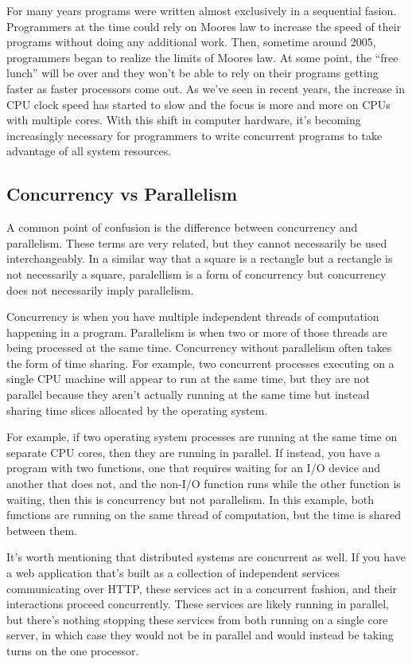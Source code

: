 \documentclass{article}
\begin{document}
For many years programs were written almost exclusively in a sequential fasion.
Programmers at the time could rely on Moores law to increase the speed of their
programs without doing any additional work. Then, sometime around 2005, programmers
began to realize the limits of Moores law. At some point, the ``free lunch'' will
be over and they won't be able to rely on their programs getting faster as faster processors
come out. As we've seen in recent years, the increase in CPU clock speed has started to slow
and the focus is more and more on CPUs with multiple cores. With this shift in computer
hardware, it's becoming increasingly necessary for programmers to write concurrent programs
to take advantage of all system resources.

\subsection{Concurrency vs Parallelism}
A common point of confusion is the difference between concurrency and parallelism.
These terms are very related, but they cannot necessarily be used interchangeably.
In a similar way that a square is a rectangle but a rectangle is not necessarily a
square, paralellism is a form of concurrency but concurrency does not necessarily
imply parallelism.

Concurrency is when you have multiple independent threads of computation happening
in a program. Parallelism is when two or more of those threads are being processed
at the same time. Concurrency without parallelism often takes the form of time sharing.
For example, two concurrent processes executing on a single CPU machine will appear
to run at the same time, but they are not parallel because they aren't actually running
at the same time but instead sharing time slices allocated by the operating system.

For example, if two operating system processes are running at the same time on
separate CPU cores, then they are running in parallel. If instead, you have a
program with two functions, one that requires waiting for an I/O device and another
that does not, and the non-I/O function runs while the other function is waiting,
then this is concurrency but not parallelism. In this example, both functions are
running on the same thread of computation, but the time is shared between them.

It's worth mentioning that distributed systems are concurrent as well. If you have
a web application that's built as a collection of independent services communicating
over HTTP, these services act in a concurrent fashion, and their interactions proceed
concurrently. These services are likely running in parallel, but there's nothing stopping
these services from both running on a single core server, in which case they would not
be in parallel and would instead be taking turns on the one processor.
\end{document}
